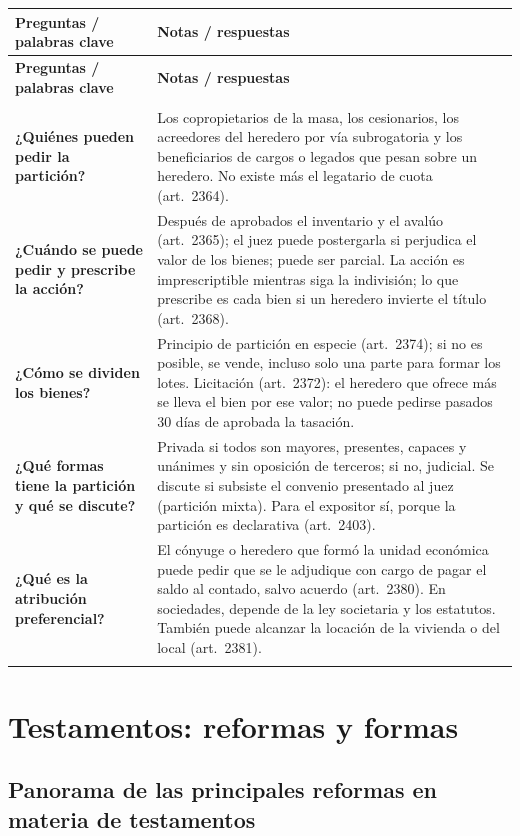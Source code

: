 \documentclass[12pt,oneside]{book}
\newenvironment{cornell}{%
    \begin{longtable}{>{\raggedright\arraybackslash}p{0.27\textwidth}
                      >{\raggedright\arraybackslash}p{0.66\textwidth}}
    \toprule
    \textbf{Preguntas / palabras clave} & \textbf{Notas / respuestas} \\
    \midrule
    \endfirsthead
    \toprule
    \textbf{Preguntas / palabras clave} & \textbf{Notas / respuestas} \\
    \midrule
    \endhead
    \midrule[0.3pt]
    \multicolumn{2}{r}{\footnotesize\textit{Continúa en la página siguiente}} \\
    \endfoot
    \endlastfoot
}{%
    \end{longtable}
}
\newcommand{\cornellrow}[2]{%
    \textbf{#1} & #2 \\
    \midrule[0.3pt]
}
\newcommand{\cornellsummary}[1]{%
    \midrule
    \multicolumn{2}{p{\dimexpr0.93\textwidth+2\tabcolsep\relax}}{%
        \textbf{Resumen:} #1} \\
    \bottomrule
}
\begin{document}
\begin{cornell}
\cornellrow{¿Quiénes pueden pedir la partición?}{Los copropietarios de la masa, los cesionarios, los acreedores del heredero por vía subrogatoria y los beneficiarios de cargos o legados que pesan sobre un heredero. No existe más el legatario de cuota (art.~2364).}
\cornellrow{¿Cuándo se puede pedir y prescribe la acción?}{Después de aprobados el inventario y el avalúo (art.~2365); el juez puede postergarla si perjudica el valor de los bienes; puede ser parcial. La acción es imprescriptible mientras siga la indivisión; lo que prescribe es cada bien si un heredero invierte el título (art.~2368).}
\cornellrow{¿Cómo se dividen los bienes?}{Principio de partición en especie (art.~2374); si no es posible, se vende, incluso solo una parte para formar los lotes. Licitación (art.~2372): el heredero que ofrece más se lleva el bien por ese valor; no puede pedirse pasados 30 días de aprobada la tasación.}
\cornellrow{¿Qué formas tiene la partición y qué se discute?}{Privada si todos son mayores, presentes, capaces y unánimes y sin oposición de terceros; si no, judicial. Se discute si subsiste el convenio presentado al juez (partición mixta). Para el expositor sí, porque la partición es declarativa (art.~2403).}
\cornellrow{¿Qué es la atribución preferencial?}{El cónyuge o heredero que formó la unidad económica puede pedir que se le adjudique con cargo de pagar el saldo al contado, salvo acuerdo (art.~2380). En sociedades, depende de la ley societaria y los estatutos. También puede alcanzar la locación de la vivienda o del local (art.~2381).}
\cornellsummary{La partición exige inventario y avalúo, es imprescriptible mientras subsista la indivisión de hecho, se hace en especie o con venta y licitación, y puede ser privada, judicial o mixta. La atribución preferencial permite adjudicarse la unidad económica pagando el saldo.}
\end{cornell}
\chapter[Testamentos: reformas y formas]{Testamentos: reformas y formas}

\section{Panorama de las principales reformas en materia de testamentos}
\end{document}
